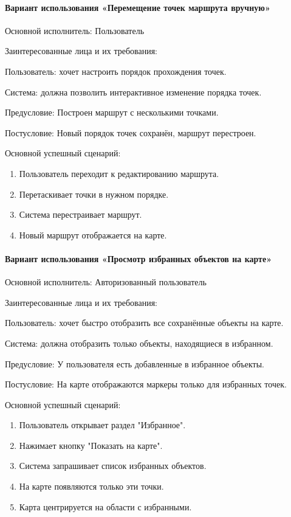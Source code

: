 \paragraph{Вариант использования «Перемещение точек маршрута вручную»}

Основной исполнитель: Пользователь

Заинтересованные лица и их требования:

Пользователь: хочет настроить порядок прохождения точек.

Система: должна позволить интерактивное изменение порядка точек.

Предусловие: Построен маршрут с несколькими точками.

Постусловие: Новый порядок точек сохранён, маршрут перестроен.

Основной успешный сценарий:
\begin{enumerate}
	\item Пользователь переходит к редактированию маршрута.
	\item Перетаскивает точки в нужном порядке.
	\item Система перестраивает маршрут.
	\item Новый маршрут отображается на карте.
\end{enumerate}

\paragraph{Вариант использования «Просмотр избранных объектов на карте»}

Основной исполнитель: Авторизованный пользователь

Заинтересованные лица и их требования:

Пользователь: хочет быстро отобразить все сохранённые объекты на карте.

Система: должна отобразить только объекты, находящиеся в избранном.

Предусловие: У пользователя есть добавленные в избранное объекты.

Постусловие: На карте отображаются маркеры только для избранных точек.

Основной успешный сценарий:
\begin{enumerate}
	\item Пользователь открывает раздел "Избранное".
	\item Нажимает кнопку "Показать на карте".
	\item Система запрашивает список избранных объектов.
	\item На карте появляются только эти точки.
	\item Карта центрируется на области с избранными.
\end{enumerate}

